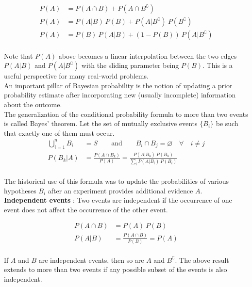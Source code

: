 \begin{align}
	P(A) &= P(A \cap B) + P(A \cap B^\complement) \\
	P(A) &= P(A|B)\ P(B) + P(A|B^\complement)\ P(B^\complement)\\
	P(A) &= P(B) \ P(A|B) + (1 - P(B))\ P(A|B^\complement)
\end{align} \\

Note that $ P(A) $ above becomes a linear interpolation between the two edges $ P(A|B) $ and $ P(A|B^\complement) $ with the sliding parameter being $ P(B) $. This is a useful perspective for many real-world problems.\\

An important pillar of Bayesian probability is the notion of updating a prior probability estimate after incorporating new (usually incomplete) information about the outcome. \\

The generalization of the conditional probability formula to more than two events is called Bayes' theorem. Let the set of mutually exclusive events $ \{ B_i \} $ be such that exactly one of them must occur. \\

\begin{align}
	\bigcup_{i = 1}^{n} B_i &= S \qquad \text{and} \qquad B_i \cap B_j = \varnothing \quad \forall \quad i \neq j \\
	P(B_k|A) &= \frac{P(A \cap B_k)}{P(A)} = \frac{P(A | B_k) \ P(B_k)}{\sum_{i}P(A | B_i) \ P(B_i)}
\end{align} \\

The historical use of this formula was to update the probabilities of various hypotheses $ {B_i} $ after an experiment provides additional evidence $ A $.\\

\textbf{Independent events} : Two events are independent if the occurrence of one event does not affect the occurrence of the other event. 

\begin{align}
	P(A \cap B) &= P(A) \ P(B) \\
	P(A|B) &= \frac{P(A \cap B)}{P(B)} = P(A)
\end{align} \\

If $ A $ and $ B $ are independent events, then so are $ A $ and $ B^\complement $. The above result extends to more than two events if any possible subset of the events is also independent. 

\newpage

